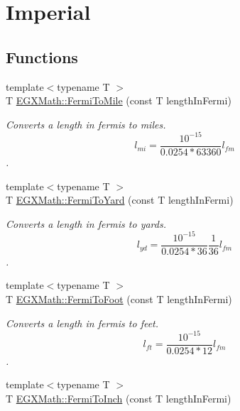 \hypertarget{group___e_g_x_math-_conversions-_length_conversions-_non-_s_i-_fermi-_imperial}{}\section{Imperial}
\label{group___e_g_x_math-_conversions-_length_conversions-_non-_s_i-_fermi-_imperial}
\subsection*{Functions}
\begin{DoxyCompactItemize}
\item 
{\footnotesize template$<$typename T $>$ }\\T \mbox{\hyperlink{group___e_g_x_math-_conversions-_length_conversions-_non-_s_i-_fermi-_imperial_gaf74233f6bd05bd9a63a486813d3b4bf8}{E\+G\+X\+Math\+::\+Fermi\+To\+Mile}} (const T length\+In\+Fermi)
\begin{DoxyCompactList}\small\item\em Converts a length in fermis to miles. \[ l_{mi}=\frac{10^{-15}}{0.0254 * 63360} l_{fm} \]. \end{DoxyCompactList}\item 
{\footnotesize template$<$typename T $>$ }\\T \mbox{\hyperlink{group___e_g_x_math-_conversions-_length_conversions-_non-_s_i-_fermi-_imperial_ga5dce34089b9de102570c5c9c68b58176}{E\+G\+X\+Math\+::\+Fermi\+To\+Yard}} (const T length\+In\+Fermi)
\begin{DoxyCompactList}\small\item\em Converts a length in fermis to yards. \[ l_{yd}= \frac{10^{-15}}{0.0254 * 36} \frac{1}{36} l_{fm} \]. \end{DoxyCompactList}\item 
{\footnotesize template$<$typename T $>$ }\\T \mbox{\hyperlink{group___e_g_x_math-_conversions-_length_conversions-_non-_s_i-_fermi-_imperial_ga22e9d7b13f45ef14c3963254caff7d78}{E\+G\+X\+Math\+::\+Fermi\+To\+Foot}} (const T length\+In\+Fermi)
\begin{DoxyCompactList}\small\item\em Converts a length in fermis to feet. \[ l_{ft}= \frac{10^{-15}}{0.0254 * 12} l_{fm} \]. \end{DoxyCompactList}\item 
{\footnotesize template$<$typename T $>$ }\\T \mbox{\hyperlink{group___e_g_x_math-_conversions-_length_conversions-_non-_s_i-_fermi-_imperial_gaacac85ebc839bc27889740d9ae608259}{E\+G\+X\+Math\+::\+Fermi\+To\+Inch}} (const T length\+In\+Fermi)

\end{DoxyCompactItemize}
